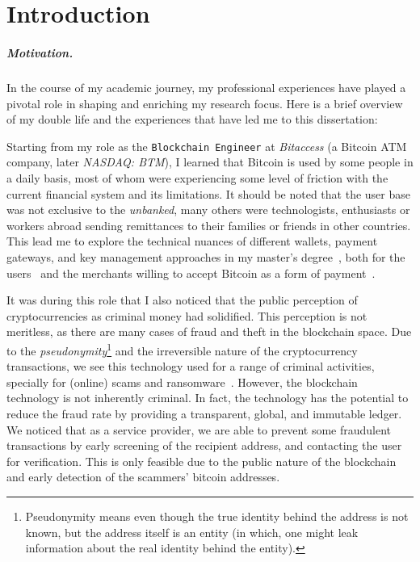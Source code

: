 

\chapter{Introduction} \label{sec:intro}



\paragraph{Motivation.} In the course of my academic journey, my professional experiences have played a pivotal role in shaping and enriching my research focus. Here is a brief overview of my double life and the experiences that have led me to this dissertation: %

Starting from my role as the \texttt{Blockchain Engineer} at \textit{Bitaccess} (a Bitcoin ATM company, later \textit{NASDAQ: BTM}), I learned that Bitcoin is used by some people in a daily basis, most of whom were experiencing some level of friction with the current financial system and its limitations. It should be noted that the user base was not exclusive to the \textit{unbanked}, many others were technologists, enthusiasts or workers abroad sending remittances to their families or friends in other countries. This lead me to explore the technical nuances of different wallets, payment gateways, and key management approaches in my master’s degree~\cite{eskandari2015real}, both for the users~\cite{EBSC15} and the merchants willing to accept Bitcoin as a form of payment~\cite{eskandari2016buy}.

It was during this role that I also noticed that the public perception of cryptocurrencies as criminal money had solidified. This perception is not meritless, as there are many cases of fraud and theft in the blockchain space. Due to the \textit{pseudonymity}\footnote{Pseudonymity means even though the true identity behind the address is not known, but the address itself is an entity (in which, one might leak information about the real identity behind the entity).} and the irreversible nature of the cryptocurrency transactions, we see this technology used for a range of criminal activities, specially for (online) scams and ransomware~\cite{paquet2019ransomware,conti2018economic}. However, the blockchain technology is not inherently criminal. In fact, the technology has the potential to reduce the fraud rate by providing a transparent, global, and immutable ledger. We noticed that as a service provider, we are able to prevent some fraudulent transactions by early screening of the recipient address, and contacting the user for verification. This is only feasible due to the public nature of the blockchain and early detection of the scammers' bitcoin addresses.

